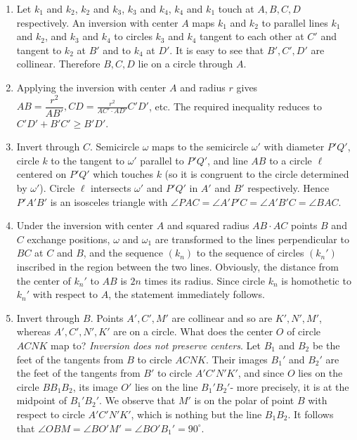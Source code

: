 \documentclass[11pt,a4paper]{article}
\begin{document}
\begin{enumerate}
\item Let $k_1$ and $k_2$, $k_2$ and $k_3$, $k_3$ and $k_4$, $k_4$ and $k_1$ touch at  $A,B,C,D$ respectively. An inversion with center $A$ maps $k_1$ and $k_2$ to parallel lines $k_1$ and $k_2$, and $k_3$ and $k_4$ to circles $k_3$ and $k_4$ tangent to each other at $C'$ and tangent to $k_2$ at $B'$ and to $k_4$ at $D'$. It is easy to see that $B',C',D'$ are collinear. Therefore $B,C,D$ lie on a circle through $A$. 

\item Applying the inversion with center $A$ and radius $r$ gives  $AB=\dfrac{r^2}{AB'}, CD=\frac{r^2}{AC\prime \cdot AD\prime } C\prime D\prime$, etc. The required inequality reduces to $C\prime D\prime +B\prime C\prime \geq B\prime D\prime$. 

\item Invert through $C$. Semicircle $\omega$ maps to the semicircle $\omega'$ with diameter $P'Q'$, circle $k$ to the tangent to $\omega'$ parallel to $P'Q'$, and line $AB$ to a circle $\ell$ centered on $P'Q'$ which touches $k$ (so it is congruent to the circle determined by $\omega'$). Circle $\ell$ intersects $\omega'$ and $P'Q'$ in $A'$ and $B'$ respectively. Hence $P'A'B'$ is an isosceles triangle with $\angle PAC=\angle A\prime P\prime C= \angle A\prime B\prime C=\angle BAC$. 

\item Under the inversion with center $A$ and squared radius $AB\cdot AC$ points $B$ and $C$ exchange positions, $\omega$ and $\omega_1$ are transformed to the lines perpendicular to $BC$ at $C$ and $B$, and the sequence $(k_n)$ to the sequence of circles $(k_n')$ inscribed in the region between the two lines. Obviously, the distance from the center of $k_n'$ to $AB$ is $2n$ times its radius. Since circle $k_n$ is homothetic to $k_n'$ with respect to $A$, the statement immediately follows. 

\item Invert through $B$. Points $A',C',M'$ are collinear and so are $K\prime ,N\prime ,M\prime$, whereas $A\prime ,C\prime ,N\prime, K\prime$ are on a circle. What does the center $O$ of circle $ACNK$ map to? \emph{Inversion does not preserve centers}. Let $B_1$ and $B_2$ be the feet of the tangents from $B$ to circle $ACNK$. Their images $B_1'$ and $B_2'$ are the feet of the tangents from $B'$ to circle $A'C'N'K'$, and since $O$ lies on the circle $BB_1B_2$, its image $O'$ lies on the line $B_1'B_2'$- more precisely, it is at the midpoint of $B_1'B_2'$. We observe that $M'$ is on the polar of point $B$ with respect to circle $A\prime C\prime N\prime K\prime$, which is nothing but the line $B_1B_2$. It follows that $\angle
OBM=\angle BO\prime M\prime =\angle BO\prime B_1\prime =90^{\circ}$. 


\end{enumerate}
\end{document}
